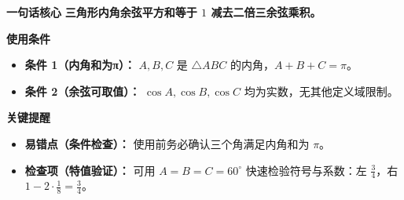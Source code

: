 \begin{summarybox}
\textbf{\textcolor{CSummary}{一句话核心}}
\textbf{三角形内角余弦平方和等于 $1$ 减去二倍三余弦乘积。}

\medskip
\textbf{\textcolor{CSummary}{使用条件}}
\begin{itemize}[leftmargin=*, itemsep=0.5em, topsep=0.4em]
    \item \textbf{条件 1（内角和为π）：} $A,B,C$ 是 $\triangle ABC$ 的内角，$A+B+C=\pi$。
    \item \textbf{条件 2（余弦可取值）：} $\cos A,\cos B,\cos C$ 均为实数，无其他定义域限制。
\end{itemize}

\medskip
\textbf{\textcolor{CSummary}{关键提醒}}
\begin{itemize}[leftmargin=*, itemsep=0.5em, topsep=0.4em]
    \item \textbf{易错点（条件检查）：} 使用前务必确认三个角满足内角和为 $\pi$。
    \item \textbf{检查项（特值验证）：} 可用 $A=B=C=60^\circ$ 快速检验符号与系数：左 $\frac34$，右 $1-2\cdot\frac18=\frac34$。
\end{itemize}
\end{summarybox}
